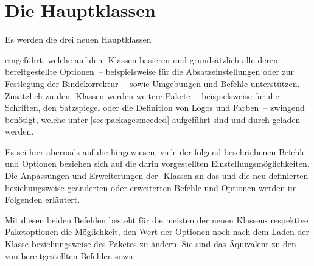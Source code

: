 \chapter[%
  Die Hauptklassen \Class{tudscrbook}, \Class{tudscrreprt} und 
  \Class{tudscrartcl}%
]{%
  Die Hauptklassen%
}
\begin{DeclareEntity*}{}
\begin{DeclareEntity*}{}
\begin{DeclareEntity*}{}
%
Es werden die drei neuen Hauptklassen
%
\begin{description}
\item {}
\item {}
\item {}
\end{description}
%
eingeführt, welche auf den \KOMAScript-Klassen basieren und grundsätzlich alle 
deren bereitgestellte Optionen~-- beispielsweise  für 
die Absatzeinstellungen oder  zur Festlegung der 
Bindekorrektur~-- sowie Umgebungen und Befehle unterstützen. Zusätzlich zu den 
\KOMAScript-Klassen werden weitere Pakete~-- beispielsweise für die Schriften, 
den Satzspiegel oder die Definition von Logos und Farben~-- zwingend benötigt, 
welche unter \autoref{sec:packages:needed} aufgeführt sind und durch \TUDScript 
geladen werden.

Es sei hier abermals auf die  
hingewiesen, viele der folgend beschriebenen Befehle und Optionen beziehen sich 
auf die darin vorgestellten Einstellungsmöglichkeiten. Die Anpassungen und 
Erweiterungen der \KOMAScript-Klassen an das \CD und die neu definierten 
beziehungsweise geänderten oder erweiterten Befehle und Optionen werden im 
Folgenden erläutert.

\begin{Declaration}
  {}
\begin{Declaration}
  {}
Mit diesen beiden Befehlen besteht für die meisten der neuen Klassen- respektive
Paketoptionen die Möglichkeit, den Wert der Optionen noch nach dem Laden der 
Klasse beziehungsweise des Paketes zu ändern. Sie sind das Äquivalent zu den 
von \KOMAScript bereitgestellten Befehlen  sowie 
.


\end{Declaration}
\end{Declaration}
\end{DeclareEntity*}
\end{DeclareEntity*}
\end{DeclareEntity*}
